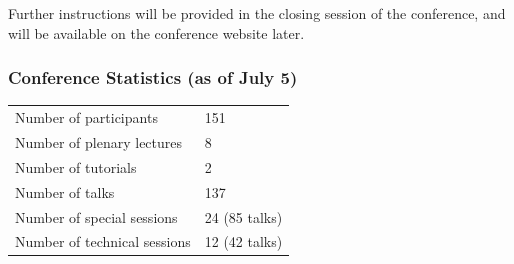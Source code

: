 Further instructions will be provided in the closing session of the conference, and will be available on the conference
website later.

\subsubsection{Conference Statistics (as of July 5)}

\begin{center}
 \begin{tabular}{ll}
 Number of participants & 151 \\
 Number of plenary lectures & 8 \\
 Number of tutorials & 2 \\
 Number of talks & 137 \\
 Number of special sessions & 24 (85 talks) \\
 Number of technical sessions & 12 (42 talks) \\
 \end{tabular}
\end{center}